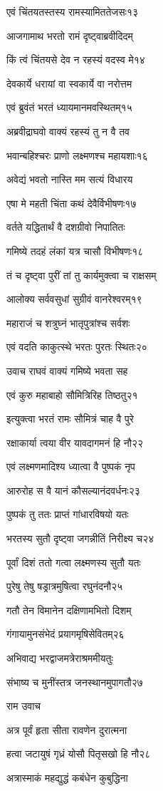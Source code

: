 एवं चिंतयतस्तस्य रामस्यामिततेजसः१३

आजगामाथ भरतो रामं दृष्ट्वाब्रवीदिदम्

किं त्वं चिंतयसे देव न रहस्यं वदस्व मे१४

देवकार्ये धरायां वा स्वकार्ये वा नरोत्तम

एवं ब्रुवंतं भरतं ध्यायमानमवस्थितम्१५

अब्रवीद्राघवो वाक्यं रहस्यं तु न वै तव

भवान्बहिश्चरः प्राणो लक्ष्मणश्च महायशाः१६

अवेद्यं भवतो नास्ति मम सत्यं विधारय

एषा मे महती चिंता कथं देवैर्विभीषणः१७

वर्तते यद्धितार्थं वै दशग्रीवो निपातितः

गमिष्ये तदहं लंकां यत्र चासौ विभीषणः१८

तं च दृष्ट्वा पुरीं तां तु कार्यमुक्त्वा च राक्षसम्

आलोक्य सर्ववसुधां सुग्रीवं वानरेश्वरम्१९

महाराजं च शत्रुघ्नं भातृपुत्रांश्च सर्वशः

एवं वदति काकुत्स्थे भरतः पुरतः स्थितः२०

उवाच राघवं वाक्यं गमिष्ये भवता सह

एवं कुरु महाबाहो सौमित्रिरिह तिष्ठतु२१

इत्युक्त्वा भरतं रामः सौमित्रं चाह वै पुरे

रक्षाकार्या त्वया वीर यावदागमनं हि नौ२२

एवं लक्ष्मणमादिश्य ध्यात्वा वै पुष्पकं नृप

आरुरोह स वै यानं कौसल्यानंदवर्धनः२३

पुष्पकं तु ततः प्राप्तं गांधारविषयो यतः

भरतस्य सुतौ दृष्ट्वा जगन्नीतिं निरीक्ष्य च२४

पूर्वां दिशं ततो गत्वा लक्ष्मणस्य सुतौ यतः

पुरेषु तेषु षड्रात्रमुषित्वा रघुनंदनौ२५

गतौ तेन विमानेन दक्षिणामभितो दिशम्

गंगायामुनसंभेदं प्रयागमृषिसेवितम्२६

अभिवाद्य भरद्वाजमत्रेराश्रममीयतुः

संभाष्य च मुनींस्तत्र जनस्थानमुपागतौ२७

राम उवाच

अत्र पूर्वं हृता सीता रावणेन दुरात्मना

हत्वा जटायुषं गृध्रं योसौ पितृसखो हि नौ२८

अत्रास्माकं महद्युद्धं कबंधेन कुबुद्धिना

